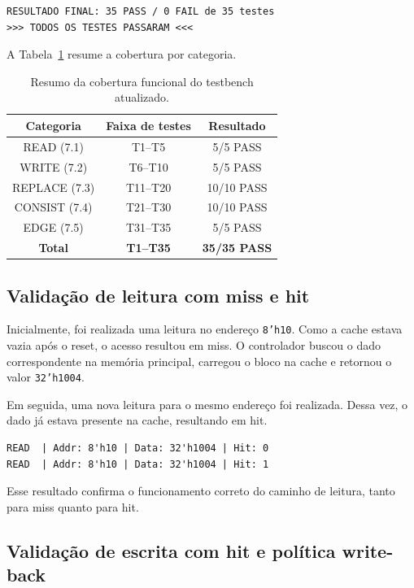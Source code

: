 ﻿\documentclass[12pt,a4paper]{article}
\begin{document}
\begin{verbatim}
RESULTADO FINAL: 35 PASS / 0 FAIL de 35 testes
>>> TODOS OS TESTES PASSARAM <<<
\end{verbatim}

A Tabela~\ref{tab:testes-cache} resume a cobertura por categoria.

\begin{table}[h]
\centering
\begin{tabular}{|c|c|c|}
\hline
\textbf{Categoria} & \textbf{Faixa de testes} & \textbf{Resultado} \\
\hline
READ (7.1) & T1--T5 & 5/5 PASS \\
\hline
WRITE (7.2) & T6--T10 & 5/5 PASS \\
\hline
REPLACE (7.3) & T11--T20 & 10/10 PASS \\
\hline
CONSIST (7.4) & T21--T30 & 10/10 PASS \\
\hline
EDGE (7.5) & T31--T35 & 5/5 PASS \\
\hline
\textbf{Total} & \textbf{T1--T35} & \textbf{35/35 PASS} \\
\hline
\end{tabular}
\caption{Resumo da cobertura funcional do testbench atualizado.}
\label{tab:testes-cache}
\end{table}
\subsection{Validação de leitura com miss e hit}

Inicialmente, foi realizada uma leitura no endereço \texttt{8'h10}. Como a cache estava vazia após o reset, o acesso resultou em miss. O controlador buscou o dado correspondente na memória principal, carregou o bloco na cache e retornou o valor \texttt{32'h1004}.

Em seguida, uma nova leitura para o mesmo endereço foi realizada. Dessa vez, o dado já estava presente na cache, resultando em hit.

\begin{verbatim}
READ  | Addr: 8'h10 | Data: 32'h1004 | Hit: 0
READ  | Addr: 8'h10 | Data: 32'h1004 | Hit: 1
\end{verbatim}

Esse resultado confirma o funcionamento correto do caminho de leitura, tanto para miss quanto para hit.

\subsection{Validação de escrita com hit e política write-back}
\end{document}
